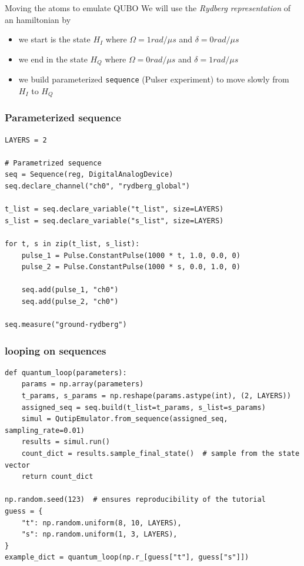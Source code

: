 \begin{frame}{Moving the atoms to emulate QUBO}
We will use the \textit{Rydberg representation} of an hamiltonian by
\begin{itemize}
    \item we start is the state $H_I$ where $\Omega = 1 rad/{\mu s}$ and $\delta = 0 rad/{\mu s}$ 
    \item we end in the state $H_Q$ where  $\Omega = 0 rad/{\mu s}$ and $\delta = 1 rad/{\mu s}$ 
    \item we build parameterized \texttt{sequence} (Pulser experiment) to move slowly from $H_I$ to $H_Q$
\end{itemize}
\end{frame}

\begin{frame}[fragile]
\frametitle{Parameterized sequence}
\begin{verbatim}
LAYERS = 2

# Parametrized sequence
seq = Sequence(reg, DigitalAnalogDevice)
seq.declare_channel("ch0", "rydberg_global")

t_list = seq.declare_variable("t_list", size=LAYERS)
s_list = seq.declare_variable("s_list", size=LAYERS)

for t, s in zip(t_list, s_list):
    pulse_1 = Pulse.ConstantPulse(1000 * t, 1.0, 0.0, 0)
    pulse_2 = Pulse.ConstantPulse(1000 * s, 0.0, 1.0, 0)

    seq.add(pulse_1, "ch0")
    seq.add(pulse_2, "ch0")

seq.measure("ground-rydberg")    
\end{verbatim}
\end{frame}

\begin{frame}[fragile]
\frametitle{looping on sequences}
\begin{verbatim}
def quantum_loop(parameters):
    params = np.array(parameters)
    t_params, s_params = np.reshape(params.astype(int), (2, LAYERS))
    assigned_seq = seq.build(t_list=t_params, s_list=s_params)
    simul = QutipEmulator.from_sequence(assigned_seq, sampling_rate=0.01)
    results = simul.run()
    count_dict = results.sample_final_state()  # sample from the state vector
    return count_dict

np.random.seed(123)  # ensures reproducibility of the tutorial
guess = {
    "t": np.random.uniform(8, 10, LAYERS),
    "s": np.random.uniform(1, 3, LAYERS),
}    
example_dict = quantum_loop(np.r_[guess["t"], guess["s"]])


\end{verbatim}    
\end{frame}

